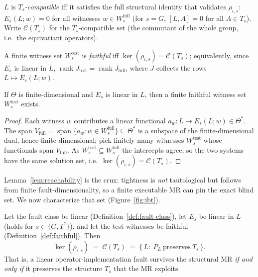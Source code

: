 \begin{definition}
\label{def:compatible}
$L$ is \emph{$T_s$-compatible} iff it satisfies the full structural identity that
validates $\rho_{\iota,s}$: $E_s(L;w)=0$ for all witnesses $w\in W^{\mathrm{full}}_s$
(for $s=G$, $[L,A]=0$ for all $A\in T_s$). Write $\mathcal{C}(T_s)$ for the
$T_s$-compatible set (the commutant of the whole group, i.e.\ the equivariant
operators).
\end{definition}

\begin{definition}[Faithfulness]
\label{def:faithful}
A finite witness set $W^{\mathrm{test}}_s$ is \emph{faithful} iff
$\ker(\rho_{\iota,s})=\mathcal{C}(T_s)$; equivalently, since $E_s$ is linear in $L$,
$\operatorname{rank}J_{\mathrm{test}}=\operatorname{rank}J_{\mathrm{full}}$, where $J$ collects the
rows $L\mapsto E_s(L;w)$.
\end{definition}

\begin{lemma}
\label{lem:reachability}
If $\Theta$ is finite-dimensional and $E_s$ is linear in $L$, then a finite
faithful witness set $W^{\mathrm{test}}_s$ exists.
\end{lemma}

\begin{proof}
Each witness $w$ contributes a linear functional $a_w:L\mapsto E_s(L;w)\in\Theta^{*}$.
The span $V_{\mathrm{full}}=\operatorname{span}\{a_w:w\in W^{\mathrm{full}}_s\}\subseteq\Theta^{*}$ is a
subspace of the finite-dimensional dual, hence finite-dimensional; pick finitely
many witnesses $W^{\mathrm{test}}_s$ whose functionals span $V_{\mathrm{full}}$. As
$W^{\mathrm{test}}_s\subseteq W^{\mathrm{full}}_s$ the intercepts agree, so the two systems
have the same solution set, i.e.\ $\ker(\rho_{\iota,s})=\mathcal{C}(T_s)$.
\end{proof}

Lemma~\ref{lem:reachability} is the crux: tightness is \emph{not} tautological but
follows from finite fault-dimensionality, so a finite executable MR can pin the
exact blind set. We now characterize that set (Figure~\ref{fig:ibt}).

\begin{theorem}
\label{thm:ibt}
Let the fault class be linear (Definition~\ref{def:fault-class}), let $E_s$ be
linear in $L$ (holds for $s\in\{G,T^{*}\}$), and let the test witnesses be faithful
(Definition~\ref{def:faithful}). Then
\[
\ker(\rho_{\iota,s})\;=\;\mathcal{C}(T_s)\;=\;\{\,L:\ P_L\ \text{preserves}\ T_s\,\}.
\]
That is, a linear operator-implementation fault survives the structural MR
\emph{if and only if} it preserves the structure $T_s$ that the MR exploits.
\end{theorem}

